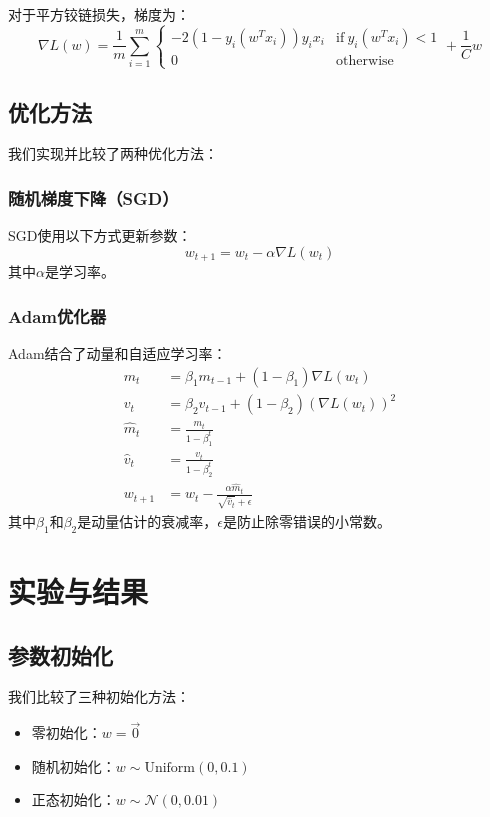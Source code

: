 \documentclass[journal, a4paper]{IEEEtran}
\begin{document}
\begin{CJK}{UTF8}{gbsn}
对于平方铰链损失，梯度为：
\begin{equation}
\nabla L(w) = \frac{1}{m}\sum_{i=1}^{m} \begin{cases} 
-2(1-y_i(w^T x_i))y_i x_i & \text{if}\ y_i(w^T x_i) < 1 \\
0 & \text{otherwise}
\end{cases} + \frac{1}{C}w
\end{equation}

\subsection{优化方法}
我们实现并比较了两种优化方法：

\subsubsection{随机梯度下降（SGD）}
SGD使用以下方式更新参数：
\begin{equation}
w_{t+1} = w_t - \alpha \nabla L(w_t)
\end{equation}
其中$\alpha$是学习率。

\subsubsection{Adam优化器}
Adam结合了动量和自适应学习率：
\begin{align}
m_t &= \beta_1 m_{t-1} + (1-\beta_1) \nabla L(w_t) \\
v_t &= \beta_2 v_{t-1} + (1-\beta_2) (\nabla L(w_t))^2 \\
\hat{m}_t &= \frac{m_t}{1-\beta_1^t} \\
\hat{v}_t &= \frac{v_t}{1-\beta_2^t} \\
w_{t+1} &= w_t - \frac{\alpha \hat{m}_t}{\sqrt{\hat{v}_t} + \epsilon}
\end{align}
其中$\beta_1$和$\beta_2$是动量估计的衰减率，$\epsilon$是防止除零错误的小常数。

\section{实验与结果}

\subsection{参数初始化}
我们比较了三种初始化方法：
\begin{itemize}
    \item 零初始化：$w = \vec{0}$
    \item 随机初始化：$w \sim \text{Uniform}(0, 0.1)$
    \item 正态初始化：$w \sim \mathcal{N}(0, 0.01)$
\end{itemize}


\end{CJK}
\end{document}
